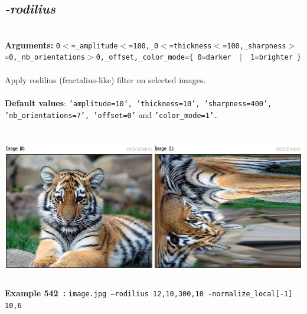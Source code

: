 \documentclass[a4paper,11pt,twoside]{book}
\begin{document}
\subsection{\emph{-rodilius} }\vspace*{-0.5em}
~\\\textbf{Arguments: } 
{\small \texttt{0$<$=\_amplitude$<$=100,\_0$<$=thickness$<$=100,\_sharpness$>$=0,\_nb\_orientations$>$0,\_offset,\_color\_mode=\{ 0=darker ~$|$~ 1=brighter \}}}\\~\\
Apply rodilius (fractalius-like) filter on selected images.
~\\~\\\textbf{Default values}: {\small \texttt{'amplitude=10', 'thickness=10', 'sharpness=400', 'nb\_orientations=7', 'offset=0'} and \texttt{'color\_mode=1'.}}
\begin{center}\includegraphics[keepaspectratio=true,height=7cm,width=\textwidth]{img/gmic_def542.jpg}\\
{\footnotesize \textbf{Example 542~:} \texttt{image.jpg --rodilius 12,10,300,10 -normalize\_local[-1] 10,6}}
\end{center}
\end{document}
